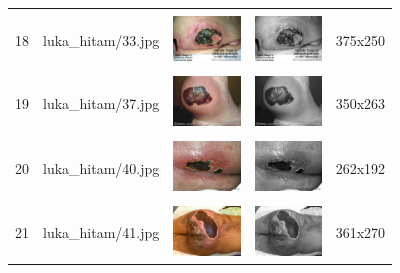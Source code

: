 \begin{table}[H]
\begin{tabular}{|m{0.2in}|m{1.2in}|m{0.7in}|m{0.7in}|m{0.7in}|}
		& &  &  &\\
		18& 
		luka\_hitam/33.jpg &
		\includegraphics[width=0.7in]{dataset/dataset_3/luka_hitam/ready/33.jpg}&
		\includegraphics[width=0.7in]{dataset/dataset_3/luka_hitam/ready/33_gray.jpg}&
		375x250\\
		\hline
		
		& &  &  &\\
		19& 
		luka\_hitam/37.jpg &
		\includegraphics[width=0.7in]{dataset/dataset_3/luka_hitam/ready/37.jpg}&
		\includegraphics[width=0.7in]{dataset/dataset_3/luka_hitam/ready/37_gray.jpg}&
		350x263\\
		\hline
		
		& &  &  &\\
		20& 
		luka\_hitam/40.jpg &
		\includegraphics[width=0.7in]{dataset/dataset_3/luka_hitam/ready/40.jpg}&
		\includegraphics[width=0.7in]{dataset/dataset_3/luka_hitam/ready/40_gray.jpg}&
		262x192\\
		\hline
		
		& &  &  &\\
		21& 
		luka\_hitam/41.jpg &
		\includegraphics[width=0.7in]{dataset/dataset_3/luka_hitam/ready/41.jpg}&
		\includegraphics[width=0.7in]{dataset/dataset_3/luka_hitam/ready/41_gray.jpg}&
		361x270\\
		\hline
	\end{tabular}
\end{table}

